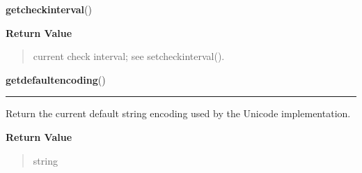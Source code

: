     \vspace{0.5ex}

\hspace{.8\funcindent}\begin{boxedminipage}{\funcwidth}

    \raggedright \textbf{getcheckinterval}()

\setlength{\parskip}{2ex}
\setlength{\parskip}{1ex}
      \textbf{Return Value}
    \vspace{-1ex}

      \begin{quote}
      current check interval; see setcheckinterval().

      \end{quote}

    \end{boxedminipage}

    \label{sys:getdefaultencoding}

    \vspace{0.5ex}

\hspace{.8\funcindent}\begin{boxedminipage}{\funcwidth}

    \raggedright \textbf{getdefaultencoding}()

    \vspace{-1.5ex}

    \rule{\textwidth}{0.5\fboxrule}
\setlength{\parskip}{2ex}
    Return the current default string encoding used by the Unicode 
    implementation.

\setlength{\parskip}{1ex}
      \textbf{Return Value}
    \vspace{-1ex}

      \begin{quote}
      string

      \end{quote}

    \end{boxedminipage}

    \label{sys:getdlopenflags}

    \vspace{0.5ex}

